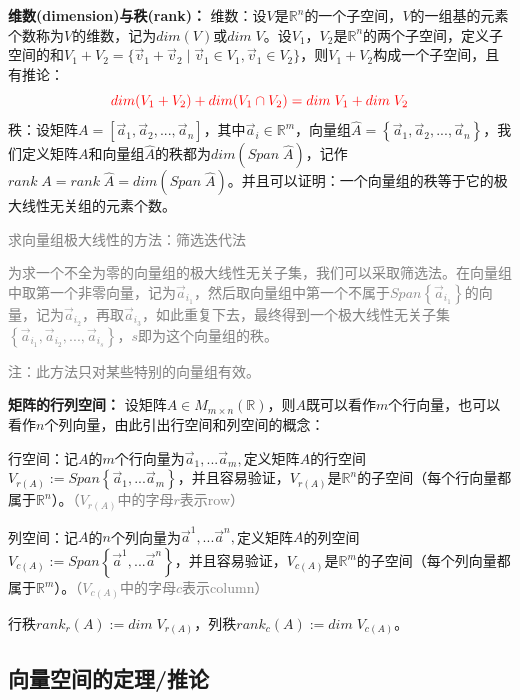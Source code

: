 \documentclass[zihao=-4,UTF8]{report}
\begin{document}
\textbf{维数(dimension)与秩(rank)：}
维数：设$V$是$\mathbb{R}^n$的一个子空间，$V$的一组基的元素个数称为$V$的维数，记为$dim(V)$或$dim\;V$。设$V_1$，$V_2$是$\mathbb{R}^n$的两个子空间，定义子空间的和$V_1+V_2=\{\vec{v}_1+\vec{v}_2\mid\vec{v}_1\in V_1,\vec{v}_1 \in V_2\}$，则$V_1+V_2$构成一个子空间，且有推论：
\begin{equation*}
    \color{red}
    dim(V_1+V_2) + dim(V_1\cap V_2) = dim\;V_1+dim\;V_2
\end{equation*}
\indent 秩：设矩阵$A=[\vec{a}_1,\vec{a}_2,...,\vec{a}_n]$，其中$\vec{a}_i \in \mathbb{R}^m$，向量组$\hat{A}=\left \{ \vec{a}_1,\vec{a}_2,...,\vec{a}_n \right \}$，我们定义矩阵$A$和向量组$\hat{A}$的秩都为$dim(Span\;\hat{A})$，记作$rank\;A = rank\;\hat{A}=dim(Span\;\hat{A})$。并且可以证明：一个向量组的秩等于它的极大线性无关组的元素个数。\par
\textcolor{gray}{求向量组极大线性的方法：筛选迭代法}\par
\textcolor{gray}{为求一个不全为零的向量组的极大线性无关子集，我们可以采取筛选法。在向量组中取第一个非零向量，记为$\vec{a}_{i_1}$，然后取向量组中第一个不属于$Span\left \{ \vec{a}_{i_1} \right \}$的向量，记为$\vec{a}_{i_2}$，再取$\vec{a}_{i_3}$，如此重复下去，最终得到一个极大线性无关子集$\left \{ \vec{a}_{i_1},\vec{a}_{i_2},...,\vec{a}_{i_s} \right \}$，$s$即为这个向量组的秩。}\par
\textcolor{gray}{注：此方法只对某些特别的向量组有效。}

\textbf{矩阵的行列空间：}
设矩阵$A\in M_{m\times n}(\mathbb{R})$，则$A$既可以看作$m$个行向量，也可以看作$n$个列向量，由此引出行空间和列空间的概念：\par
行空间：记$A$的$m$个行向量为$\vec{a}_1,...\vec{a}_m,$定义矩阵$A$的行空间$V_{r(A)}:=Span \left \{ \vec{a}_1,...\vec{a}_m \right \} $，并且容易验证，$V_{r(A)}$是$\mathbb{R}^n$的子空间（每个行向量都属于$\mathbb{R}^n$）。\textcolor{gray}{（$V_{r(A)}$中的字母$r$表示row）}\par
列空间：记$A$的$n$个列向量为$\vec{a}^1,...\vec{a}^n,$定义矩阵$A$的列空间$V_{c(A)}:=Span \left \{ \vec{a}^1,...\vec{a}^n \right \} $，并且容易验证，$V_{c(A)}$是$\mathbb{R}^m$的子空间（每个列向量都属于$\mathbb{R}^m$）。\textcolor{gray}{（$V_{c(A)}$中的字母$c$表示column）}\par
行秩$rank_r(A):=dim\;V_{r(A)}$，列秩$rank_c(A):=dim\;V_{c(A)}$。

\subsection{向量空间的定理/推论}
\end{document}
